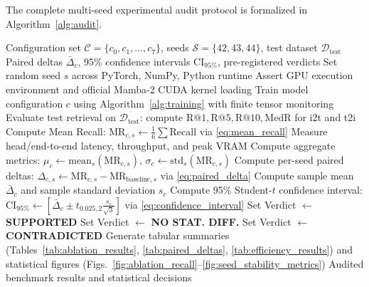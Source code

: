 \documentclass[10pt,journal,final]{IEEEtran}
\begin{document}
The complete multi-seed experimental audit protocol is formalized in Algorithm~\ref{alg:audit}.

\begin{algorithm}[htbp]
\caption{Multi-Seed Experimental Audit Protocol}
\label{alg:audit}
\begin{algorithmic}[1]
\REQUIRE Configuration set $\mathcal{C} = \{c_0, c_1, \dots, c_7\}$, seeds $\mathcal{S} = \{42, 43, 44\}$, test dataset $\mathcal{D}_{\mathrm{test}}$
\ENSURE Paired deltas $\bar{\Delta}_c$, 95\% confidence intervals $\mathrm{CI}_{95\%}$, pre-registered verdicts
        \STATE Set random seed $s$ across PyTorch, NumPy, Python runtime
        \STATE Assert GPU execution environment and official Mamba-2 CUDA kernel loading
        \STATE Train model configuration $c$ using Algorithm~\ref{alg:training} with finite tensor monitoring
        \STATE Evaluate test retrieval on $\mathcal{D}_{\mathrm{test}}$: compute $\mathrm{R@1}, \mathrm{R@5}, \mathrm{R@10}, \mathrm{MedR}$ for i2t and t2i
        \STATE Compute Mean Recall: $\mathrm{MR}_{c, s} \leftarrow \frac{1}{6}\sum \mathrm{Recall}$ via \eqref{eq:mean_recall}
        \STATE Measure head/end-to-end latency, throughput, and peak VRAM
    \ENDFOR
    \STATE Compute aggregate metrics: $\mu_c \leftarrow \mathrm{mean}_s(\mathrm{MR}_{c, s})$, $\sigma_c \leftarrow \mathrm{std}_s(\mathrm{MR}_{c, s})$
        \STATE Compute per-seed paired deltas: $\Delta_{c, s} \leftarrow \mathrm{MR}_{c, s} - \mathrm{MR}_{\mathrm{baseline}, s}$ via \eqref{eq:paired_delta}
        \STATE Compute sample mean $\bar{\Delta}_c$ and sample standard deviation $s_c$
        \STATE Compute 95\% Student-$t$ confidence interval: $\mathrm{CI}_{95\%} \leftarrow [\bar{\Delta}_c \pm t_{0.025, 2} \frac{s_c}{\sqrt{3}}]$ via \eqref{eq:confidence_interval}
            \STATE Set Verdict $\leftarrow$ \textbf{SUPPORTED}
            \STATE Set Verdict $\leftarrow$ \textbf{NO STAT. DIFF.}
        \ELSE
            \STATE Set Verdict $\leftarrow$ \textbf{CONTRADICTED}
        \ENDIF
    \ENDIF
\ENDFOR
\STATE Generate tabular summaries (Tables~\ref{tab:ablation_results}, \ref{tab:paired_deltas}, \ref{tab:efficiency_results}) and statistical figures (Figs.~\ref{fig:ablation_recall}--\ref{fig:seed_stability_metrics})
\RETURN Audited benchmark results and statistical decisions
\end{algorithmic}
\end{algorithm}
\end{document}
